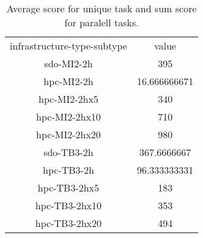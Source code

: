 \begin{table}[!h]
	\centering
        \caption{Average score for unique task and sum score for paralell tasks.}
        \label{tab:values_score_sdo-evn-test}
	{
		\begin{tabular}{cc}
			\toprule
			\multicolumn{0}{c}{infrastructure-type-subtype} & \multicolumn{1}{c}{value} \\
             \cline{0-1}
            sdo-MI2-2h & 395 \\
            hpc-MI2-2h & 16.666666671 \\
            hpc-MI2-2hx5 & 340 \\
            hpc-MI2-2hx10 & 710 \\
            hpc-MI2-2hx20 & 980 \\
            sdo-TB3-2h & 367.6666667 \\
            hpc-TB3-2h & 96.333333331 \\
            hpc-TB3-2hx5 & 183 \\
            hpc-TB3-2hx10 & 353 \\
            hpc-TB3-2hx20 & 494 \\
			\bottomrule
		\end{tabular}
	}
\end{table}